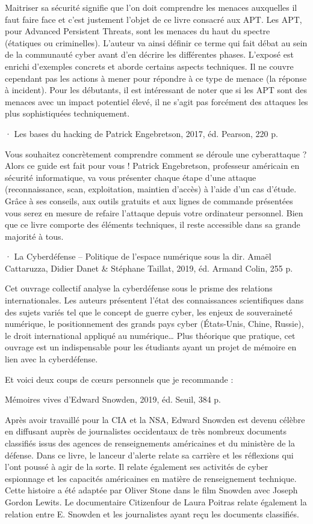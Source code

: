 Maitriser sa sécurité signifie que l’on doit comprendre les menaces auxquelles il faut faire face et c’est justement l’objet de ce livre consacré aux APT. Les APT, pour Advanced Persistent Threats, sont les menaces du haut du spectre (étatiques ou criminelles). L’auteur va ainsi définir ce terme qui fait débat au sein de la communauté cyber avant d’en décrire les différentes phases. L’exposé est enrichi d’exemples concrets et aborde certains aspects techniques. Il ne couvre cependant pas les actions à mener pour répondre à ce type de menace (la réponse à incident). Pour les débutants, il est intéressant de noter que si les APT sont des menaces avec un impact potentiel élevé, il ne s’agit pas forcément des attaques les plus sophistiquées techniquement.


·       Les bases du hacking de Patrick Engebretson, 2017, éd. Pearson, 220 p.

Vous souhaitez concrètement comprendre comment se déroule une cyberattaque ? Alors ce guide est fait pour vous ! Patrick Engebretson, professeur américain en sécurité informatique, va vous présenter chaque étape d’une attaque (reconnaissance, scan, exploitation, maintien d’accès) à l’aide d’un cas d’étude. Grâce à ses conseils, aux outils gratuits et aux lignes de commande présentées vous serez en mesure de refaire l’attaque depuis votre ordinateur personnel. Bien que ce livre comporte des éléments techniques, il reste accessible dans sa grande majorité à tous.


·       La Cyberdéfense – Politique de l’espace numérique sous la dir. Amaël Cattaruzza, Didier Danet & Stéphane Taillat, 2019, éd. Armand Colin, 255 p.

Cet ouvrage collectif analyse la cyberdéfense sous le prisme des relations internationales. Les auteurs présentent l’état des connaissances scientifiques dans des sujets variés tel que le concept de guerre cyber, les enjeux de souveraineté numérique, le positionnement des grands pays cyber (États-Unis, Chine, Russie), le droit international appliqué au numérique… Plus théorique que pratique, cet ouvrage est un indispensable pour les étudiants ayant un projet de mémoire en lien avec la cyberdéfense.


Et voici deux coups de cœurs personnels que je recommande :

    Mémoires vives d’Edward Snowden, 2019, éd. Seuil, 384 p.

Après avoir travaillé pour la CIA et la NSA, Edward Snowden est devenu célèbre en diffusant auprès de journalistes occidentaux de très nombreux documents classifiés issus des agences de renseignements américaines et du ministère de la défense. Dans ce livre, le lanceur d’alerte relate sa carrière et les réflexions qui l’ont poussé à agir de la sorte. Il relate également ses activités de cyber espionnage et les capacités américaines en matière de renseignement technique. Cette histoire a été adaptée par Oliver Stone dans le film Snowden avec Joseph Gordon Lewits. Le documentaire Citizenfour de Laura Poitras relate également la relation entre E. Snowden et les journalistes ayant reçu les documents classifiés. 

